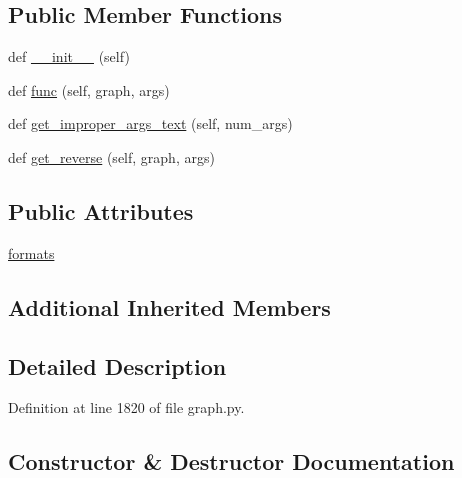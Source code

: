\subsection*{Public Member Functions}
\begin{DoxyCompactItemize}
\item 
def \hyperlink{classlight__chats_1_1graph_1_1UnlockFunction_a307201afcd25d90e5c99badda71e0f02}{\+\_\+\+\_\+init\+\_\+\+\_\+} (self)
\item 
def \hyperlink{classlight__chats_1_1graph_1_1UnlockFunction_a60b9bd71f3b3d8255c9f79a3a408914f}{func} (self, graph, args)
\item 
def \hyperlink{classlight__chats_1_1graph_1_1UnlockFunction_a25cc5dcf53d2d9bc588ab635aeb376eb}{get\+\_\+improper\+\_\+args\+\_\+text} (self, num\+\_\+args)
\item 
def \hyperlink{classlight__chats_1_1graph_1_1UnlockFunction_a8527e0ee7a1f29a4daf4899451cdaa6f}{get\+\_\+reverse} (self, graph, args)
\end{DoxyCompactItemize}
\subsection*{Public Attributes}
\begin{DoxyCompactItemize}
\item 
\hyperlink{classlight__chats_1_1graph_1_1UnlockFunction_a8e80f007572fa2ce7624eca4ec645a56}{formats}
\end{DoxyCompactItemize}
\subsection*{Additional Inherited Members}


\subsection{Detailed Description}
\begin{DoxyVerb}\end{DoxyVerb}
 

Definition at line 1820 of file graph.\+py.



\subsection{Constructor \& Destructor Documentation}
\mbox{\label{classlight__chats_1_1graph_1_1UnlockFunction_a307201afcd25d90e5c99badda71e0f02}} 
